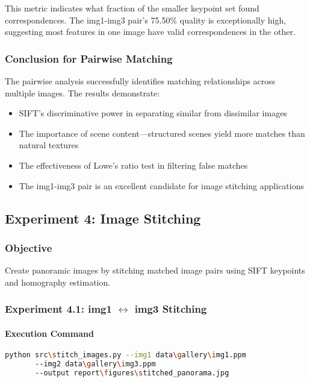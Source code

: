 \documentclass[12pt,a4paper]{article}
\begin{document}
This metric indicates what fraction of the smaller keypoint set found correspondences. The img1-img3 pair's 75.50\% quality is exceptionally high, suggesting most features in one image have valid correspondences in the other.

\subsubsection{Conclusion for Pairwise Matching}
The pairwise analysis successfully identifies matching relationships across multiple images. The results demonstrate:
\begin{itemize}
    \item SIFT's discriminative power in separating similar from dissimilar images
    \item The importance of scene content—structured scenes yield more matches than natural textures
    \item The effectiveness of Lowe's ratio test in filtering false matches
    \item The img1-img3 pair is an excellent candidate for image stitching applications
\end{itemize}

\subsection{Experiment 4: Image Stitching}

\subsubsection{Objective}
Create panoramic images by stitching matched image pairs using SIFT keypoints and homography estimation.

\subsubsection{Experiment 4.1: img1 $\leftrightarrow$ img3 Stitching}

\paragraph{Execution Command}
\begin{lstlisting}[language=bash]
python src\stitch_images.py --img1 data\gallery\img1.ppm 
       --img2 data\gallery\img3.ppm 
       --output report\figures\stitched_panorama.jpg
\end{lstlisting}
\end{document}

